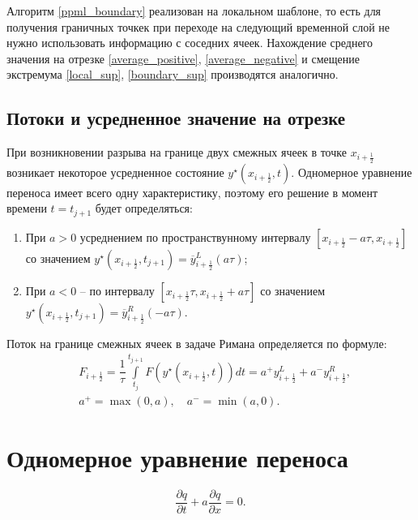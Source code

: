 \documentclass[12pt,a4paper]{article}
\newcommand{\half}{\frac{1}{2}}
\begin{document}
    Алгоритм \eqref{ppml_boundary} реализован на локальном шаблоне, то есть для получения граничных точкек при переходе на следующий временной слой не нужно использовать информацию с соседних ячеек. Нахождение среднего значения на отрезке \eqref{average_positive}, \eqref{average_negative} и смещение экстремума \eqref{local_sup}, \eqref{boundary_sup} производятся аналогично.


    \subsection{Потоки и усредненное значение на отрезке}

    При возникновении разрыва на границе двух смежных ячеек в точке $ x_{i+\half} $ возникает некоторое усредненное состояние $ y^\star(x_{i+\half}, t) $. Одномерное уравнение переноса имеет всего одну характеристику, поэтому его решение в момент времени $ t = t_{j+1} $ будет определяться:
    \begin{enumerate}
        \item При $ a > 0 $ усреднением по пространствунному интервалу $ [x_{i+\half}-a \tau, x_{i+\half}] $ со значением $ y^\star(x_{i+\half}, t_{j+1}) = \overline y_{i+\half}^L(a \tau) $;
        
        \item При $ a < 0 $ -- по интервалу $ [x_{i+\half} \tau, x_{i+\half}+a \tau] $ со значением $ y^\star(x_{i+\half}, t_{j+1}) = \overline y_{i+\half}^R(-a \tau) $.
    \end{enumerate}

    Поток на границе смежных ячеек в задаче Римана определяется по формуле:
    \begin{equation}
        \label{boundary_flow}
        \begin{split}
            &F_{i+\half} = \dfrac{1}{\tau} \displaystyle \int\limits_{t_j}^{t_{j+1}} F(y^\star(x_{i+\half}, t))dt = a^+ y_{i+\half}^L + a^- y_{i+\half}^R, \\[0.5em]
            &a^+ = \max(0, a), \quad a^- = \min(a, 0).
        \end{split}
    \end{equation}

    \section{ Одномерное уравнение переноса }

    \begin{equation}
        \label{convection-diffusion}
      \dfrac{\partial q}{\partial t} + a \dfrac{\partial q}{\partial x} = 0.  
    \end{equation}
\end{document}
